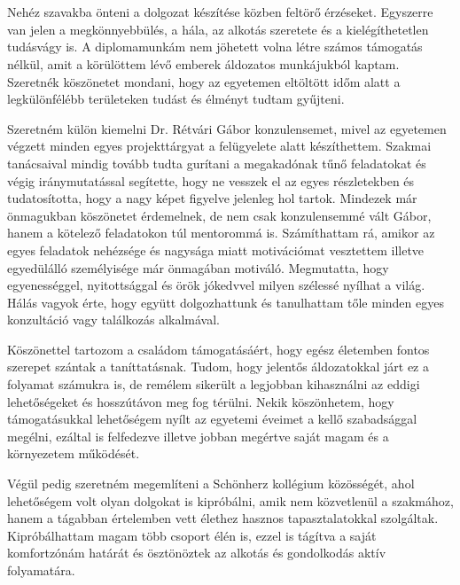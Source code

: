 \chapter*{\koszonetnyilvanitas}



Nehéz szavakba önteni a dolgozat készítése közben feltörő érzéseket.
Egyszerre van jelen a megkönnyebbülés, a hála, az alkotás szeretete és a kielégíthetetlen tudásvágy is.
A diplomamunkám nem jöhetett volna létre számos támogatás nélkül, amit a körülöttem lévő emberek áldozatos munkájukból kaptam.
Szeretnék köszönetet mondani, hogy az egyetemen eltöltött időm alatt a legkülönfélébb területeken tudást és élményt tudtam gyűjteni.

Szeretném külön kiemelni Dr. Rétvári Gábor konzulensemet, mivel az egyetemen végzett minden egyes projekttárgyat a felügyelete alatt készíthettem.
Szakmai tanácsaival mindig tovább tudta gurítani a megakadónak tűnő feladatokat és végig iránymutatással segítette, hogy ne vesszek el az egyes részletekben és tudatosította, hogy a nagy képet figyelve jelenleg hol tartok.
Mindezek már önmagukban köszönetet érdemelnek, de nem csak konzulensemmé vált Gábor, hanem a kötelező feladatokon túl mentorommá is.
Számíthattam rá, amikor az egyes feladatok nehézsége és nagysága miatt motivációmat vesztettem illetve egyedülálló személyisége már önmagában motiváló.
Megmutatta, hogy egyenességgel, nyitottsággal és örök jókedvvel milyen szélessé nyílhat a világ.
Hálás vagyok érte, hogy együtt dolgozhattunk és tanulhattam tőle minden egyes konzultáció vagy találkozás alkalmával.

Köszönettel tartozom a családom támogatásáért, hogy egész életemben fontos szerepet szántak a taníttatásnak.
Tudom, hogy jelentős áldozatokkal járt ez a folyamat számukra is, de remélem sikerült a legjobban kihasználni az eddigi lehetőségeket és hosszútávon meg fog térülni.
Nekik köszönhetem, hogy támogatásukkal lehetőségem nyílt az egyetemi éveimet a kellő szabadsággal megélni, ezáltal is felfedezve illetve jobban megértve saját magam és a környezetem működését.

Végül pedig szeretném megemlíteni a Schönherz kollégium közösségét, ahol lehetőségem volt olyan dolgokat is kipróbálni, amik nem  közvetlenül a szakmához, hanem a tágabban értelemben vett élethez hasznos tapasztalatokkal szolgáltak.
Kipróbálhattam magam több csoport élén is, ezzel is tágítva a saját komfortzónám határát és ösztönöztek az alkotás és gondolkodás aktív folyamatára.